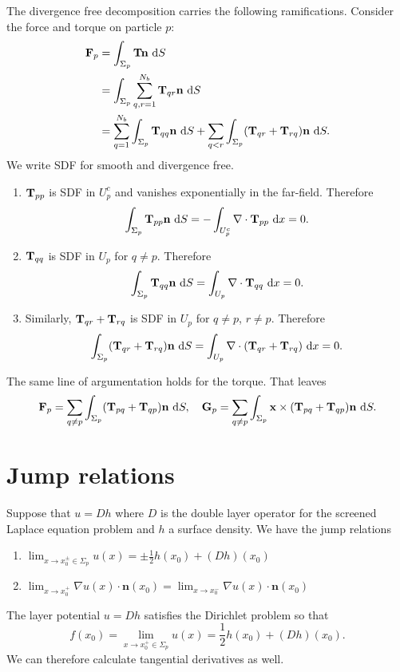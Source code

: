\documentclass[preprint,11pt]{article}
\begin{document}
The divergence free decomposition carries the following ramifications. 
Consider the force and torque on particle $p$:
\begin{align*}
{\bf F}_p 
&= \int_{\Sigma_p} {\bf T} {\bf n} \, \dif S \\
&= \int_{\Sigma_p} \sum_{q,r=1}^{N_b}{\bf T}_{qr} {\bf n} \, \dif S \\
&= \sum_{q=1}^{N_b} \int_{\Sigma_p} {\bf T}_{qq} {\bf n} \, \dif S 
+ \sum_{q<r}  \int_{\Sigma_p} ({\bf T}_{qr}+{\bf T}_{rq}) {\bf n} \, \dif S.
\end{align*}
We write SDF for smooth and divergence free. 
\begin{enumerate}
\item
${\bf T}_{pp}$ is SDF  in $U_p^c$ and vanishes exponentially in the far-field.  Therefore 
\[\int_{\Sigma_p} {\bf T}_{pp} {\bf n} \, \dif S = -\int_{U_p^c} \nabla \cdot {\bf T}_{pp}   \, \dif x = 0.\]
\item
${\bf T}_{qq}$ is SDF  in $U_p$ for $q \neq p$.  Therefore 
\[\int_{\Sigma_p} {\bf T}_{qq} {\bf n} \, \dif S = \int_{U_p} \nabla \cdot {\bf T}_{qq}   \, \dif x = 0.\]
\item
Similarly, ${\bf T}_{qr} + {\bf T}_{rq}$ is SDF  in $U_p$ for $q \neq p$, $r \neq p.$  Therefore 
\[\int_{\Sigma_p} ({\bf T}_{qr}  + {\bf T}_{rq}){\bf n} \, \dif S = \int_{U_p} \nabla \cdot ({\bf T}_{qr}  + {\bf T}_{rq})   \, \dif x = 0.\]
\end{enumerate}
The same line of argumentation holds for the torque. 
That leaves
\begin{equation}
{\bf F}_p = \sum_{q \neq p}  \int_{\Sigma_p} ({\bf T}_{pq}+{\bf T}_{qp}) {\bf n} \, \dif S,\quad
{\bf G}_p = \sum_{q \neq p}  \int_{\Sigma_p} {\bf x} \times ({\bf T}_{pq}+{\bf T}_{qp}) {\bf n} \, \dif S.
\end{equation}

\section{Jump relations}
Suppose that $u = Dh$ where $D$ is the double layer operator for the screened Laplace equation
problem and $h$ a surface density. We have the jump relations 
\begin{enumerate}
\item $ \lim_{x \to x_0^\pm \in \Sigma_p} u(x) = \pm\frac{1}{2}h(x_0) + (Dh)(x_0)$
\item $ \lim_{x \to x_0^+} \nabla u(x) \cdot \mathbf{n}(x_0) = \lim_{x \to x_0^-} \nabla u(x) \cdot \mathbf{n}(x_0)$
\end{enumerate}
The layer potential $u = Dh$ satisfies the Dirichlet problem so that 
\begin{equation}
f(x_0) = \lim_{x \to x_0^+ \in \Sigma_p} u(x) = \frac{1}{2}h(x_0) + (Dh)(x_0).
\end{equation}
We can therefore calculate tangential derivatives as well. 
\end{document}

